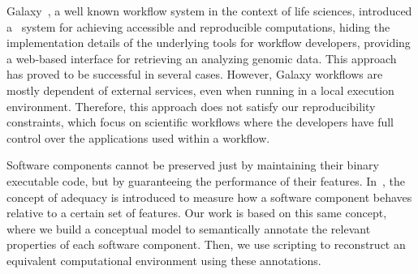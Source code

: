 

Galaxy~\cite{goecks2010galaxy}, a well known workflow system in the context 
of life sciences, introduced a ~system for achieving accessible 
and reproducible computations, hiding the implementation details of the 
underlying tools for workflow developers, providing a web-based interface for 
retrieving an analyzing genomic data. This approach has proved to be 
successful in several cases. However, Galaxy workflows are mostly dependent of
external services, even when running in a local execution environment.
Therefore, this approach does not satisfy our reproducibility constraints, 
which focus on scientific workflows where the developers have full control
over the applications used within a workflow.





Software components cannot be preserved just by maintaining their binary executable code, but by guaranteeing the performance of their features. In~\cite{Matthews}, the concept of adequacy is introduced to measure how a software component behaves relative to a certain set of features. Our work is based on this same concept, where we build a conceptual model to semantically annotate the relevant properties of each software component. Then, we use scripting to reconstruct an equivalent computational environment using these annotations.



